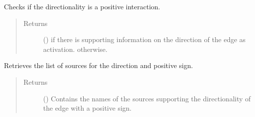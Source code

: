 \documentclass[letterpaper,10pt,english]{sphinxmanual}
\begin{document}
\begin{fulllineitems}
\begin{fulllineitems}
\begin{quote}
\begin{description}
\end{description}\end{quote}

\end{fulllineitems}


\begin{fulllineitems}
\label{\detokenize{main:pypath.main.Direction.positive_reverse}}
Checks if the  directionality is a positive
interaction.
\begin{quote}\begin{description}
\item[{Returns}] \leavevmode
() \textendash{}  if there is supporting information on
the  direction of the edge as activation.
 otherwise.

\end{description}\end{quote}

\end{fulllineitems}


\begin{fulllineitems}
\label{\detokenize{main:pypath.main.Direction.positive_sources_reverse}}
Retrieves the list of sources for the 
direction and positive sign.
\begin{quote}\begin{description}
\item[{Returns}] \leavevmode
() \textendash{} Contains the names of the sources supporting the
 directionality of the edge with a
positive sign.

\end{description}\end{quote}

\end{fulllineitems}



\end{fulllineitems}
\end{document}
